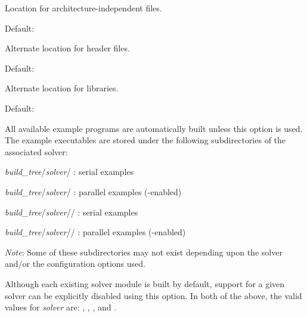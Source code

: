\begin{config}
  
\item {}
  
  Location for architecture-independent files.
  
  Default: 
  
\item {}
  
  Alternate location for header files.
  
  Default: 
  
\item {}
  
  Alternate location for libraries.
  
  Default: 

\item {}
  
  All available example programs are automatically built unless this option is
  used. The example executables are stored under the following subdirectories
  of the associated solver: 
  
  \begin{config}
  \item {\em build\_tree}/{\em solver}/ : serial {\C} examples
  \item {\em build\_tree}/{\em solver}/ : parallel {\C} examples ({\mpi}-enabled)
  \item {\em build\_tree}/{\em solver}// : serial {\F} examples
  \item {\em build\_tree}/{\em solver}// : parallel {\F} examples ({\mpi}-enabled)
  \end{config}
  
  {\em Note}: Some of these subdirectories may not exist depending upon the
  solver and/or the configuration options used.
  
\item {}

  Although each existing solver module is built by default, support for a
  given solver can be explicitly disabled using this option. In both of the
  above, the valid values for {\em solver} are: , ,
  , and .
  
\item {}


\end{config}

